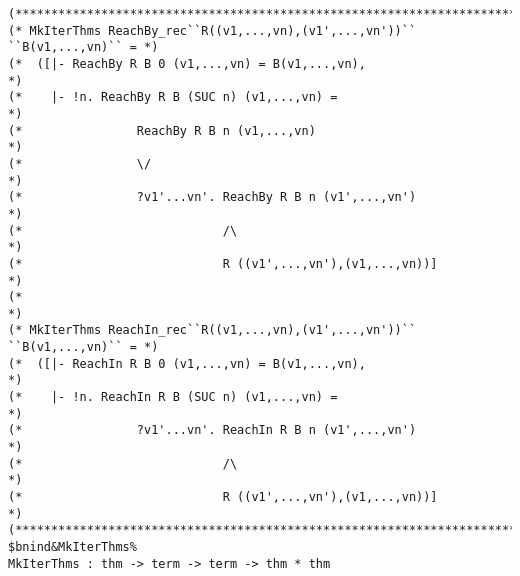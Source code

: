 \documentclass[12pt]{article}
\begin{document}
\begin{footnotesize}
\begin{Verbatim}[commandchars=\$\&\%]
(*****************************************************************************)
(* MkIterThms ReachBy_rec``R((v1,...,vn),(v1',...,vn'))`` ``B(v1,...,vn)`` = *)
(*  ([|- ReachBy R B 0 (v1,...,vn) = B(v1,...,vn),                           *)
(*    |- !n. ReachBy R B (SUC n) (v1,...,vn) =                               *)
(*                ReachBy R B n (v1,...,vn)                                  *)
(*                \/                                                         *)
(*                ?v1'...vn'. ReachBy R B n (v1',...,vn')                    *)
(*                            /\                                             *)
(*                            R ((v1',...,vn'),(v1,...,vn))]                 *)
(*                                                                           *)
(* MkIterThms ReachIn_rec``R((v1,...,vn),(v1',...,vn'))`` ``B(v1,...,vn)`` = *)
(*  ([|- ReachIn R B 0 (v1,...,vn) = B(v1,...,vn),                           *)
(*    |- !n. ReachIn R B (SUC n) (v1,...,vn) =                               *)
(*                ?v1'...vn'. ReachIn R B n (v1',...,vn')                    *)
(*                            /\                                             *)
(*                            R ((v1',...,vn'),(v1,...,vn))]                 *)
(*****************************************************************************)
$bnind&MkIterThms%
MkIterThms : thm -> term -> term -> thm * thm


\end{Verbatim}
\end{footnotesize}
\end{document}
